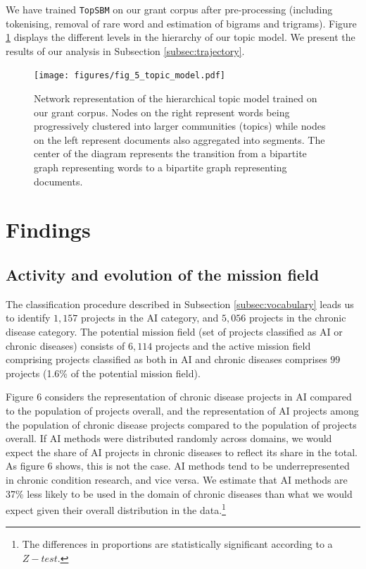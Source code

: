 \documentclass[11pt]{article}
\begin{document}
We have trained \texttt{TopSBM} on our grant corpus after pre-processing (including tokenising, removal of rare word and estimation of bigrams and trigrams). Figure \ref{fig:topic_model} displays the different levels in the hierarchy of our topic model. We present the results of our analysis in Subsection \ref{subsec:trajectory}.

\begin{figure}[!ht]
    \centering
    \texttt{[image: figures/fig\_5\_topic\_model.pdf]}
    \caption{Network representation of the hierarchical topic model trained on our grant corpus. Nodes on the right represent words being progressively clustered into larger communities (topics) while nodes on the left represent documents also aggregated into segments. The center of the diagram represents the transition from a bipartite graph representing words to a bipartite graph representing documents.}
    \label{fig:topic_model}
\end{figure}
 
\section{Findings}
\label{sec:findings}

\subsection{Activity and evolution of the mission field}

The classification procedure described in Subsection \ref{subsec:vocabulary} leads us to identify $1,157$ projects in the AI category, and $5,056$ projects in the chronic disease category. The potential mission field (set of projects classified as AI or chronic diseases) consists of $6,114$ projects and the active mission field comprising projects classified as both in AI and chronic diseases comprises $99$ projects (1.6\% of the potential mission field).

Figure 6 considers the representation of chronic disease projects in AI compared to the population of projects overall, and the representation of AI projects among the population of chronic disease projects compared to the population of projects overall. If AI methods were distributed randomly across domains, we would expect the share of AI projects in chronic diseases to reflect its share in the total.  As figure 6 shows, this is not the case. AI methods tend to be underrepresented in chronic condition research, and vice versa. We estimate that AI methods are 37\% less likely to be used in the domain of chronic diseases than what we would expect given their overall distribution in the data.\footnote{The differences in proportions are statistically significant according to a $Z-test$.}
\end{document}
